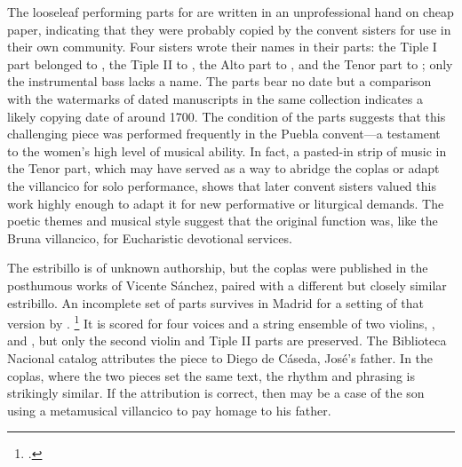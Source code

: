 
The looseleaf performing parts for  are written in an
unprofessional hand on cheap paper, indicating that they were probably copied
by the convent sisters for use in their own community.
Four sisters wrote their names in their parts:
the Tiple I part belonged to , the Tiple II to , the Alto part to , and the Tenor part
to ; only the instrumental bass lacks a name.
The parts bear no date but a comparison with the watermarks of dated
manuscripts in the same collection indicates a likely copying date of around
1700.
The condition of the parts suggests that this challenging piece was performed
frequently in the Puebla convent---a testament to the women's high level of
musical ability.%
    \Autocite{Favila:Profession}
In fact, a pasted-in strip of music in the Tenor part, which may have served
as a way to abridge the coplas or adapt the villancico for solo performance,
shows that later convent sisters valued this work highly enough to adapt it
for new performative or liturgical demands.
The poetic themes and musical style suggest that the original function was,
like the Bruna villancico, for Eucharistic devotional services.


The estribillo is of unknown authorship, but the coplas were published in the
posthumous works of Vicente Sánchez, paired with a different but closely similar
estribillo.%
   \Autocite
   [190--191:
   ]
   {Sanchez:LiraPoetica}  
An incomplete set of parts survives in Madrid for a setting of that version by
.%
    \footnote{.}
It is scored for four voices and a string ensemble of two violins,
, and , but only the second violin and Tiple
II parts are preserved.
The Biblioteca Nacional catalog attributes the piece to Diego de Cáseda, José's
father.
In the coplas, where the two pieces set the same text, the rhythm and phrasing
is strikingly similar.
If the attribution is correct, then  may be a case of
the son using a metamusical villancico to pay homage to his father.

